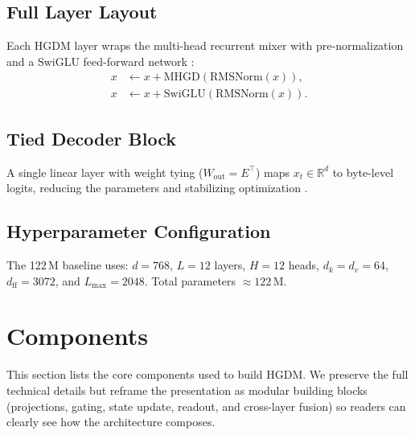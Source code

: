 \documentclass{article}
\newcommand{\R}{\mathbb{R}}
\begin{document}
\subsection{Full Layer Layout}
Each HGDM layer wraps the multi-head recurrent mixer with pre-normalization and a SwiGLU feed-forward network \cite{shazeer2020glu}:
\begin{align}
  x &\leftarrow x + \mathrm{MHGD}(\mathrm{RMSNorm}(x)), \\
  x &\leftarrow x + \mathrm{SwiGLU}(\mathrm{RMSNorm}(x)).
\end{align}

\subsection{Tied Decoder Block}
A single linear layer with weight tying ($W_{\text{out}} = E^\top$) maps $x_t \in \R^d$ to byte-level logits, reducing the parameters and stabilizing optimization \cite{press2017tying}.

\subsection{Hyperparameter Configuration}
The 122\,M baseline uses: $d = 768$, $L = 12$ layers, $H = 12$ heads, $d_k = d_v = 64$, $d_{\text{ff}} = 3072$, and $L_{\max} = 2048$. Total parameters $\approx 122$\,M.

\section{Components}
\label{sec:components}

This section lists the core components used to build HGDM. We preserve
the full technical details but reframe the presentation as modular building
blocks (projections, gating, state update, readout, and cross-layer fusion)
so readers can clearly see how the architecture composes.
\end{document}
